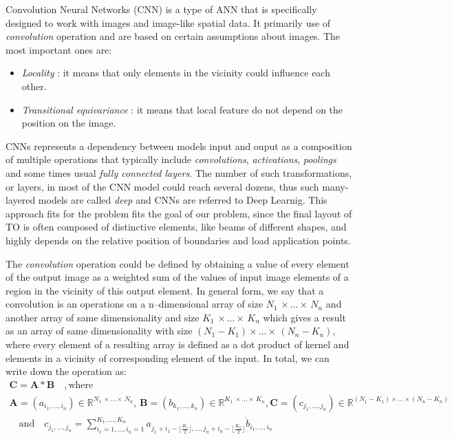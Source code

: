 Convolution Neural Networks (CNN) is a type of ANN that is specifically designed to work with images and image-like spatial data.
It primarily use of \textit{convolution} operation and are based on certain assumptions about images.
The most important ones are:
\begin{itemize}
	\item \emph{Locality} : it means that only elements in the vicinity could influence each other.
	\item \emph{Transitional equivariance} : it means that local feature do not depend on the position on the image.
\end{itemize}
CNNs represents a dependency between models input and ouput as a composition of multiple operations that typically include \emph{convolutions}, \emph{activations}, \emph{poolings} and some times usual \emph{fully connected layers}.
The number of such transformations, or layers, in most of the CNN model could reach several dozens, thus such many-layered models are called \emph{deep} and CNNs are referred to Deep Learnig\cite{}.
This approach fits for the problem fits the goal of our problem, since the final layout of TO is often composed of distinctive elements, like beams of different shapes, and highly depends on the relative position of boundaries and load application points. 
\medskip

The \textit{convolution} operation could be defined by obtaining a value of every element of the output image as a weighted sum of the values of input image elements of a region in the vicinity of this output element.
In general form, we say that a convolution is an operations on a $\mathrm{n}$--dimensional array of size $N_{1} \, \times... \times \, N_{n}$ and another array of same dimensionality and size $K_{1} \, \times... \times \, K_{n} $ which gives a result as an array of same dimensionality with size $ (N_{1}-K_{1}) \times... \times \, (N_{n}-K_{n}) $, 
where every element of a resulting array is defined as a dot product of kernel and elements in a vicinity of corresponding element of the input.
In total, we can write down the operation as:
\begin{gather*}
\mathbf{C} = \mathbf{A} \ast \mathbf{B} \quad , \mathrm{where} \quad \\ \mathbf{A} = (a_{i_{1},...,i_{n}}) \in \mathbb{R}^{N_{1} \, \times... \times \, N_{n}} , \, \mathbf{B} = (b_{k_{1},...,k_{n}}) \in \mathbb{R}^{K_{1} \, \times... \times \, K_{n}},
\mathbf{C} = (c_{j_{1},...,j_{n}}) \in \mathbb{R}^{(N_{1}-K_{1}) \times... \times (N_{n}-K_{n})} \\ \quad \mathrm{and}
\quad c_{j_{1},...,j_{n}} = \sum_{i_{1}=1,...,i_{n}=1}^{K_{1},...,K_{n}} a_{j_{1}+i_{1}-\lfloor \frac{K_{i}}{2}\rfloor,...,j_{n}+i_{n}-\lfloor \frac{K_{n}}{2}\rfloor} \dot b_{i_{1},...,i_{n}}
\end{gather*}

